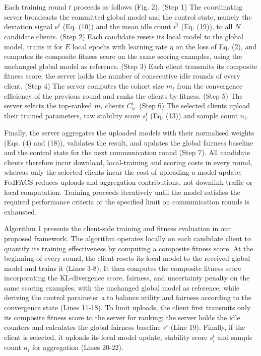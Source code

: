 \documentclass[pdflatex,sn-mathphys-num,oneside]{sn-jnl}%
\theoremstyle{thmstyleone}%
\theoremstyle{thmstyletwo}%
\theoremstyle{thmstylethree}%
\begin{document}
Each training round $t$ proceeds as follows (Fig. 2). (Step 1) The coordinating server broadcasts the committed global model and the control state, namely the deviation signal $\nu^t$ (Eq. (10)) and the mean idle count $\overline{r^t}$ (Eq. (19)), to all $N$ candidate clients. (Step 2) Each candidate resets its local model to the global model, trains it for $E$ local epochs with learning rate $\eta$ on the loss of Eq. (2), and computes its composite fitness score on the same scoring examples, using the unchanged global model as reference. (Step 3) Each client transmits its composite fitness score; the server holds the number of consecutive idle rounds of every client. (Step 4) The server computes the cohort size $m_t$ from the convergence efficiency of the previous round and ranks the clients by fitness. (Step 5) The server selects the top-ranked $m_t$ clients $C_k^t$. (Step 6) The selected clients upload their trained parameters, raw stability score $s_i^t$ (Eq. (13)) and sample count $n_i$.

Finally, the server aggregates the uploaded models with their normalised weights (Eqs. (4) and (18)), validates the result, and updates the global fairness baseline and the control state for the next communication round (Step 7). All candidate clients therefore incur download, local-training and scoring costs in every round, whereas only the selected clients incur the cost of uploading a model update: FedFACS reduces uploads and aggregation contributions, not downlink traffic or local computation. Training proceeds iteratively until the model satisfies the required performance criteria or the specified limit on communication rounds is exhausted.

Algorithm 1 presents the client-side training and fitness evaluation in our proposed framework. The algorithm operates locally on each candidate client to quantify its training effectiveness by computing a composite fitness score. At the beginning of every round, the client resets its local model to the received global model and trains it (Lines 3-8). It then computes the composite fitness score incorporating the KL-divergence score, fairness, and uncertainty penalty on the same scoring examples, with the unchanged global model as reference, while deriving the control parameter \textit{a} to balance utility and fairness according to the convergence state (Lines 11-18). To limit uploads, the client first transmits only its composite fitness score to the server for ranking; the server holds the idle counters and calculates the global fairness baseline $\overline{r^t}$ (Line 19). Finally, if the client is selected, it uploads its local model update, stability score $s_i^t$ and sample count $n_i$ for aggregation (Lines 20-22).
\end{document}
